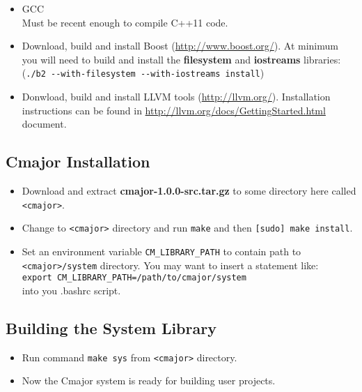 \documentclass[oneside, a4paper, 11pt]{article}
\begin{document}
\begin{itemize}

\item
GCC\\
Must be recent enough to compile C++11 code.

\item
Download, build and install Boost (\url{http://www.boost.org/}).
At minimum you will need to build and install the
\textbf{filesystem} and \textbf{iostreams} libraries:\\
(\verb|./b2 --with-filesystem --with-iostreams install|)

\item
Donwload, build and install LLVM tools (\url{http://llvm.org/}).
Installation instructions can be found in \url{http://llvm.org/docs/GettingStarted.html} document.

\end{itemize}

\subsection{Cmajor Installation}

\begin{itemize}

\item
Download and extract \textbf{cmajor-1.0.0-src.tar.gz} to some directory here called \verb|<cmajor>|.

\item
Change to \verb|<cmajor>| directory and run \verb|make| and then \verb|[sudo] make install|.

\item
Set an environment variable \verb|CM_LIBRARY_PATH| to contain path to \verb|<cmajor>/system| directory.
You may want to insert a statement like:\\
\verb|export CM_LIBRARY_PATH=/path/to/cmajor/system|\\
into you .bashrc script.

\end{itemize}

\subsection{Building the System Library}

\begin{itemize}

\item
Run command \verb|make sys| from \verb|<cmajor>| directory.

\item
Now the Cmajor system is ready for building user projects.

\end{itemize}
\end{document}
